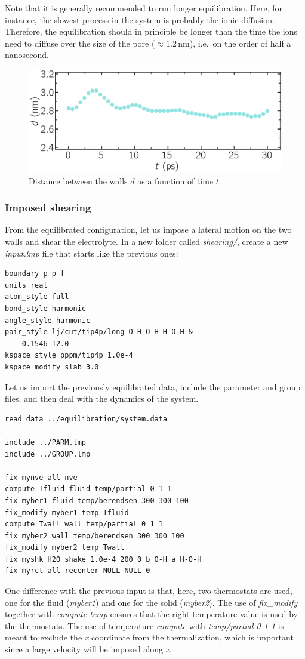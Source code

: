 \documentclass[9pt,tutorial]{livecoms}
\begin{document}
Note that it is generally recommended to run longer equilibration. Here, for
instance, the slowest process in the system is probably the ionic diffusion.
Therefore, the equilibration should in principle be longer than the time
the ions need to diffuse over the size of the pore ($\approx 1.2\,\text{nm}$),
i.e.~on the order of half a nanosecond.

\begin{figure}
\centering
\includegraphics[width=\linewidth]{NANOSHEAR-equilibration}
\caption{Distance between the walls $d$ as a function of time $t$.}
\label{fig:NANOSHEAR-equilibration}
\end{figure}

\subsubsection{Imposed shearing}

From the equilibrated configuration, let us impose a lateral motion on the two
walls and shear the electrolyte. In a new folder called \textit{shearing/},
create a new \textit{input.lmp} file that starts like the previous ones:
\begin{lstlisting}
boundary p p f
units real
atom_style full
bond_style harmonic
angle_style harmonic
pair_style lj/cut/tip4p/long O H O-H H-O-H &
    0.1546 12.0
kspace_style pppm/tip4p 1.0e-4
kspace_modify slab 3.0
\end{lstlisting}
Let us import the previously equilibrated data, include the parameter and group
files, and then deal with the dynamics of the system.
\begin{lstlisting}
read_data ../equilibration/system.data

include ../PARM.lmp
include ../GROUP.lmp

fix mynve all nve
compute Tfluid fluid temp/partial 0 1 1
fix myber1 fluid temp/berendsen 300 300 100
fix_modify myber1 temp Tfluid
compute Twall wall temp/partial 0 1 1
fix myber2 wall temp/berendsen 300 300 100
fix_modify myber2 temp Twall
fix myshk H2O shake 1.0e-4 200 0 b O-H a H-O-H
fix myrct all recenter NULL NULL 0
\end{lstlisting}
One difference with the previous input is that, here, two thermostats are used,
one for the fluid (\textit{myber1}) and one for the solid (\textit{myber2}).
The use of \textit{fix\_modify} together with \textit{compute temp} ensures
that the right temperature value is used by the thermostats. The use of
temperature \textit{compute} with \textit{temp/partial 0 1 1} is meant to exclude
the \textit{x} coordinate from the thermalization, which is important since a
large velocity will be imposed along \textit{x}.
\end{document}

